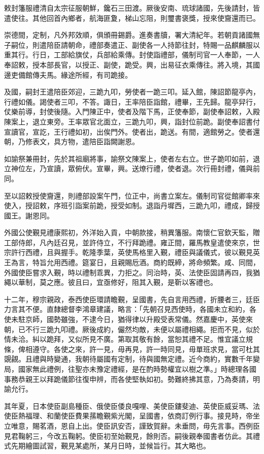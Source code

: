 \begin{pinyinscope}
敕封籓服禮清自太宗征服朝鮮，鑱石三田渡。厥後安南、琉球諸國，先後請封，皆遣使往。其他回首內鄉者，航海匪夐，梯山忘阻，則璽書褒獎，授來使齎還而已。

崇德間，定制，凡外邦效順，俱頒冊錫爵。進奏書牘，署大清紀年。若朝貢諸國無子嗣位，則遣陪臣請朝命，禮部奏遣正、副使各一人持節往封，特賜一品麒麟服以重其行。行日，工部給旗仗，兵部給乘傳。封使詣禮部，儀制司官一人奉節，一人奉詔敕，授本部長官，以授正、副使，跪受。興，出易征衣乘傳往。將入境，其國邊吏備館傳夫馬。緣途所經，有司跪接。

及國，嗣封王遣陪臣郊迎，三跪九叩，勞使者一跪三叩。延入館，陳詔節龍亭內，行禮如儀。謁使者三叩，不答。諏日，王率陪臣詣館，禮畢，王先歸。龍亭舁行，仗樂前導，封使後隨。入門陳正中，使者及階下馬，正使奉節，副使奉詔敕，入殿陳案上，退立東旁。王率眾官北面立，三跪九叩，興，詣封位前跪。副使奉詔書付宣讀官，宣訖，王行禮如初，出俟門外。使者出，跪送。有間，適館勞之。使者還朝，乃修表文，具方物，遣陪臣詣闕謝恩。

如諭祭兼冊封，先於其祖廟將事，諭祭文陳案上，使者左右立。世子跪叩如前，退立神位左，乃宣讀，眾俯伏。宣畢，興。送燎行禮，使者退。次行冊封禮，儀與前同。

至以詔敕授使齎還，則禮部設案午門，位正中，尚書立案左。儀制司官從館卿率來使入，授詔敕，序班引詣案前跪，授受如制。退詣丹墀西，三跪九叩，禮成，歸授國王。謝恩同。

外國公使覲見禮康熙初，外洋始入貢，中朝款接，稍異籓服。南懷仁官欽天監，贈工部侍郎，凡內廷召見，並許侍立，不行拜跪禮。雍正間，羅馬教皇遣使來京，世宗許行西禮，且與握手。乾隆季葉，英使馬格里入覲，禮臣與議儀式，彼以覲見英王為言，特旨允用西禮。筵宴日，且親賜卮酒。商約既締，將命頻繁。咸、同間，外國使臣嘗求入覲，時以禮制乖異，力拒之。同治時，英、法使臣固請再四，我猶繩以華制，莫之應。彼且曰，宜亟修好，阻其入覲，是靳以客禮也。

十二年，穆宗親政，泰西使臣環請瞻覲，呈國書，先自言用西禮，折腰者三，廷臣力言其不便。直隸總督李鴻章建議，略言：「先朝召見西使時，各國未立和約，各使未駐京師，國勢雖強，不逮今日，猶得律以升殿受表常儀。然嘉慶中，英使來朝，已不行三跪九叩禮。厥後成約，儼然均敵，未便以屬禮相繩。拒而不見，似於情未洽。糾以跪拜，又似所見不廣。第取其敬有餘，當恕其禮不足。惟宜議立規條，俾相遵守。各使之來，許一見，毋再見，許一時同見，毋單班求見，當可杜其覬覦。且禮與時變通，我朝待屬國有定制，待與國無定禮。近今商約，實數千年變局，國家無此禮例，往聖亦未豫定禮經，是在酌時勢權宜以樹之準。」時總理各國事務恭親王以拜跪儀節往復申辨，而各使堅執如初。勢難終拂其意，乃為奏請，明諭允行。

其年夏，日本使臣副島種臣、俄使臣倭良嘎哩、美使臣鏤斐迪、英使臣威妥瑪、法使臣熱福理、和蘭使臣費果蓀瞻覲紫光閣，呈國書，依商訂例行事。接見時，帝坐立唯意，賜茗酒，恩自上出。使臣訊安否，謹致賀辭。未垂問，毋先言事。西例臣見君鞠躬三，今改五鞠躬。使臣初至始覲見，餘則否。嗣後親奉國書者仿此。其禮式先期繪圖試習，覲見某處所，某月日時，並候旨行。其大略也。


\end{pinyinscope}
